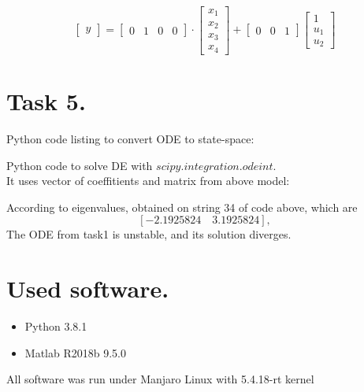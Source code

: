 \documentclass[a4paper,12pt]{article}
\begin{document}
\begin{equation*}
    \begin{bmatrix}
        y
    \end{bmatrix}
    =
    \begin{bmatrix}
        0 & 1 & 0 & 0
    \end{bmatrix}
    \cdot
    \begin{bmatrix}
        x_1 \\ x_2 \\ x_3 \\ x_4
    \end{bmatrix}
    +
    \begin{bmatrix}
        0 & 0 & 1
    \end{bmatrix}
    \begin{bmatrix}
        1 \\ u_1 \\ u_2
    \end{bmatrix}
\end{equation*}
\newpage
\section{Task 5.}
Python code listing to convert ODE to state-space:

Python code to solve DE with $scipy.integration.odeint$.\\ 
It uses vector of coeffitients and matrix from above model:

According to eigenvalues, obtained on string 34 of code above, which are 
$$[-2.1925824\quad  3.1925824],$$
The ODE from task1 is unstable, and its solution diverges.
\section{Used software.}
\begin{itemize}
    \item Python 3.8.1
    \item Matlab R2018b 9.5.0
\end{itemize}
All software was run under Manjaro Linux with 5.4.18-rt kernel
\end{document}

